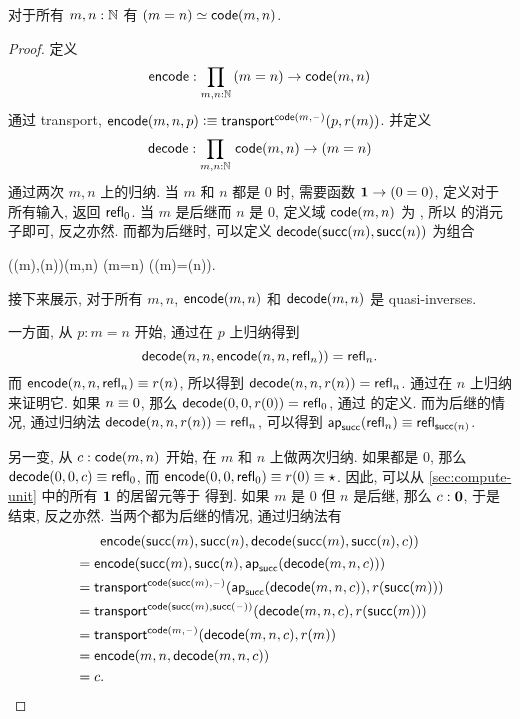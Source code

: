 \begin{thm}\label{thm:path-nat}
  对于所有 $m,n:\mathbb{N}$ 有 $(m=n) \simeq \mathsf{code}(m,n)$.
\end{thm}
\begin{proof}
  定义
  \[ \encode : \prd{m,n:\N} (m=n) \to \code(m,n) \]
  通过 transport, $\mathsf{encode}(m,n,p) \vcentcolon\equiv \mathsf{transport}^{\mathsf{code}(m,{\mathord{\hspace{1pt}\text{--}\hspace{1pt}}})}(p,r(m))$.
  并定义
  \[ \decode : \prd{m,n:\N} \code(m,n) \to (m=n) \]
  通过两次 $m,n$ 上的归纳.
  当 $m$ 和 $n$ 都是 $0$ 时, 需要函数 $\mathbf{1} \to (0=0)$, 定义对于所有输入, 返回 $\mathsf{refl}_{0}$.
  当 $m$ 是后继而 $n$ 是 $0$, 定义域 $\mathsf{code}(m,n)$ 为 \emptyt, 所以 \emptyt 的消元子即可, 反之亦然.
  而都为后继时, 可以定义 $\mathsf{decode}(\mathsf{succ}(m),\mathsf{succ}(n))$ 为组合
  \begin{narrowmultline*}
    \code(\suc(m),\suc(n))\jdeq\code(m,n)
     \narrowbreak
    (m=n)
    \xrightarrow{\apfunc{\suc}}
    (\suc(m)=\suc(n)).
  \end{narrowmultline*}
  接下来展示, 对于所有 $m,n$, $\mathsf{encode}(m,n)$ 和 $\mathsf{decode}(m,n)$ 是 quasi-inverses.

  一方面, 从 $p:m=n$ 开始, 通过在 $p$ 上归纳得到
  \[\mathsf{decode}(n,n,\mathsf{encode}(n,n,\mathsf{refl}_{n}))=\mathsf{refl}_{n}.\]
  而 $\mathsf{encode}(n,n,\mathsf{refl}_{n}) \equiv r(n)$, 所以得到 $\mathsf{decode}(n,n,r(n)) =\mathsf{refl}_{n}$.
  通过在 $n$ 上归纳来证明它.
  如果 $n\equiv 0$, 那么 $\mathsf{decode}(0,0,r(0)) =\mathsf{refl}_{0}$, 通过 \decode 的定义.
  而为后继的情况, 通过归纳法 $\mathsf{decode}(n,n,r(n)) = \mathsf{refl}_{n}$, 可以得到 $\mathsf{ap}_{\mathsf{succ}}(\mathsf{refl}_{n}) \equiv \mathsf{refl}_{\mathsf{succ}(n)}$.

  另一变, 从 $c:\mathsf{code}(m,n)$ 开始, 在 $m$ 和 $n$ 上做两次归纳.
  如果都是 $0$, 那么 $\mathsf{decode}(0,0,c) \equiv \mathsf{refl}_{0}$, 而 $\mathsf{encode}(0,0,\mathsf{refl}_{0})\equiv r(0) \equiv \star$.
  因此, 可以从 \cref{sec:compute-unit} 中的所有 $\mathbf{1}$ 的居留元等于 \ttt 得到.
  如果 $m$ 是 $0$ 但 $n$ 是后继, 那么 $c:\mathbf{0}$, 于是结束, 反之亦然.
  当两个都为后继的情况, 通过归纳法有
  \begin{multline*}
    \mathsf{encode}(\mathsf{succ}(m),\mathsf{succ}(n),\mathsf{decode}(\mathsf{succ}(m),\mathsf{succ}(n),c))\\
    \begin{aligned}
    &= \mathsf{encode}(\mathsf{succ}(m),\mathsf{succ}(n),\mathsf{ap}_{\mathsf{succ}}(\mathsf{decode}(m,n,c)))\\
    &= \mathsf{transport}^{\mathsf{code}(\mathsf{succ}(m),{\mathord{\hspace{1pt}\text{--}\hspace{1pt}}})}(\mathsf{ap}_{\mathsf{succ}}(\mathsf{decode}(m,n,c)),r(\mathsf{succ}(m)))\\
    &= \mathsf{transport}^{\mathsf{code}(\mathsf{succ}(m),\mathsf{succ}({\mathord{\hspace{1pt}\text{--}\hspace{1pt}}}))}(\mathsf{decode}(m,n,c),r(\mathsf{succ}(m)))\\
    &= \mathsf{transport}^{\mathsf{code}(m,{\mathord{\hspace{1pt}\text{--}\hspace{1pt}}})}(\mathsf{decode}(m,n,c),r(m))\\
    &= \mathsf{encode}(m,n,\mathsf{decode}(m,n,c))\\
    &= c.
  \end{aligned}
  \end{multline*}
\end{proof}

